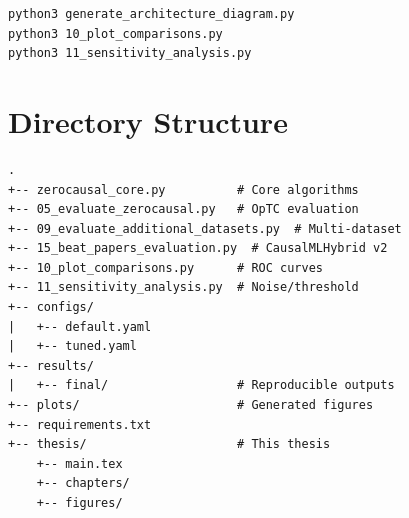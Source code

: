 \begin{lstlisting}
python3 generate_architecture_diagram.py
python3 10_plot_comparisons.py
python3 11_sensitivity_analysis.py
\end{lstlisting}

\section{Directory Structure}

\begin{lstlisting}
.
+-- zerocausal_core.py          # Core algorithms
+-- 05_evaluate_zerocausal.py   # OpTC evaluation
+-- 09_evaluate_additional_datasets.py  # Multi-dataset
+-- 15_beat_papers_evaluation.py  # CausalMLHybrid v2
+-- 10_plot_comparisons.py      # ROC curves
+-- 11_sensitivity_analysis.py  # Noise/threshold
+-- configs/
|   +-- default.yaml
|   +-- tuned.yaml
+-- results/
|   +-- final/                  # Reproducible outputs
+-- plots/                      # Generated figures
+-- requirements.txt
+-- thesis/                     # This thesis
    +-- main.tex
    +-- chapters/
    +-- figures/
\end{lstlisting}
